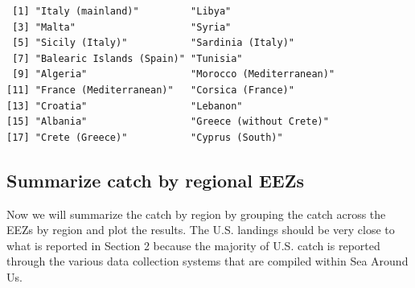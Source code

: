 \documentclass[
]{article}
\begin{document}
\begin{verbatim}
 [1] "Italy (mainland)"         "Libya"                   
 [3] "Malta"                    "Syria"                   
 [5] "Sicily (Italy)"           "Sardinia (Italy)"        
 [7] "Balearic Islands (Spain)" "Tunisia"                 
 [9] "Algeria"                  "Morocco (Mediterranean)" 
[11] "France (Mediterranean)"   "Corsica (France)"        
[13] "Croatia"                  "Lebanon"                 
[15] "Albania"                  "Greece (without Crete)"  
[17] "Crete (Greece)"           "Cyprus (South)"          
\end{verbatim}

\subsection{Summarize catch by regional
EEZs}\label{summarize-catch-by-regional-eezs}

Now we will summarize the catch by region by grouping the catch across
the EEZs by region and plot the results. The U.S. landings should be
very close to what is reported in Section 2 because the majority of U.S.
catch is reported through the various data collection systems that are
compiled within Sea Around Us.
\end{document}
